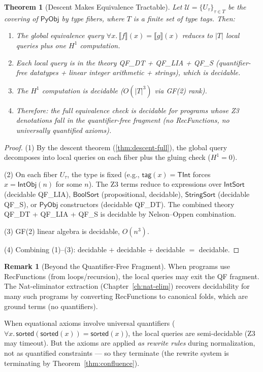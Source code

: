 \documentclass[11pt,a4paper]{report}
\theoremstyle{definition}
\newtheorem{remark}[definition]{Remark}
\theoremstyle{plain}
\newtheorem{theorem}[definition]{Theorem}
\newcommand{\den}[1]{\llbracket #1 \rrbracket}
\newcommand{\PyObj}{\mathsf{PyObj}}
\newcommand{\covers}{\mathcal{U}}
\newcommand{\Hone}{H^1}
\begin{document}
\begin{theorem}[Descent Makes Equivalence Tractable]
\label{thm:descent-tractable}
Let $\covers = \{U_\tau\}_{\tau \in T}$ be the covering of
$\PyObj$ by type fibers, where $T$ is a finite set of type tags.
Then:
\begin{enumerate}
  \item The global equivalence query
    $\forall x.\, \den{f}(x) = \den{g}(x)$ reduces to
    $|T|$ local queries plus one $\Hone$ computation.
  \item Each local query is in the theory QF\_DT + QF\_LIA + QF\_S
    (quantifier-free datatypes + linear integer arithmetic + strings),
    which is \emph{decidable}.
  \item The $\Hone$ computation is decidable ($O(|T|^3)$ via GF(2)
    rank).
  \item Therefore: the full equivalence check is decidable for
    programs whose Z3 denotations fall in the quantifier-free
    fragment (no RecFunctions, no universally quantified axioms).
\end{enumerate}
\end{theorem}

\begin{proof}
(1) By the descent theorem (\ref{thm:descent-full}), the global query
decomposes into local queries on each fiber plus the gluing check
($\Hone = 0$).

(2) On each fiber $U_\tau$, the type is fixed (e.g., $\mathsf{tag}(x) =
\mathsf{TInt}$ forces $x = \mathsf{IntObj}(n)$ for some $n$).
The Z3 terms reduce to expressions over $\mathsf{IntSort}$
(decidable QF\_LIA), $\mathsf{BoolSort}$ (propositional, decidable),
$\mathsf{StringSort}$ (decidable QF\_S), or $\mathsf{PyObj}$ constructors
(decidable QF\_DT).  The combined theory QF\_DT + QF\_LIA + QF\_S
is decidable by Nelson--Oppen combination.

(3) GF(2) linear algebra is decidable, $O(n^3)$.

(4) Combining (1)--(3): decidable $+$ decidable $+$ decidable $=$
decidable.
\end{proof}

\begin{remark}[Beyond the Quantifier-Free Fragment]
When programs use RecFunctions (from loops/recursion), the local
queries may exit the QF fragment.  The Nat-eliminator extraction
(Chapter~\ref{ch:nat-elim}) recovers decidability for many such
programs by converting RecFunctions to canonical folds, which are
ground terms (no quantifiers).

When equational axioms involve universal quantifiers ($\forall x.\,
\mathsf{sorted}(\mathsf{sorted}(x)) = \mathsf{sorted}(x)$), the
local queries are semi-decidable (Z3 may timeout).  But the axioms
are applied \emph{as rewrite rules} during normalization, not as
quantified constraints --- so they terminate (the rewrite system is
terminating by Theorem~\ref{thm:confluence}).
\end{remark}
\end{document}
